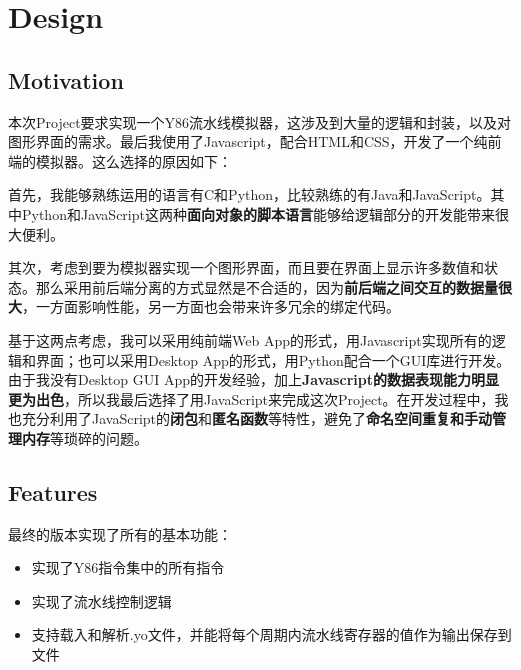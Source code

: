 
\section{Design}

\subsection{Motivation}

本次Project要求实现一个Y86流水线模拟器，这涉及到大量的逻辑和封装，以及对图形界面的需求。最后我使用了Javascript，配合HTML和CSS，开发了一个纯前端的模拟器。这么选择的原因如下：

首先，我能够熟练运用的语言有C和Python，比较熟练的有Java和JavaScript。其中Python和JavaScript这两种{\bf 面向对象的脚本语言}能够给逻辑部分的开发能带来很大便利。

其次，考虑到要为模拟器实现一个图形界面，而且要在界面上显示许多数值和状态。那么采用前后端分离的方式显然是不合适的，因为{\bf 前后端之间交互的数据量很大}，一方面影响性能，另一方面也会带来许多冗余的绑定代码。

基于这两点考虑，我可以采用纯前端Web App的形式，用Javascript实现所有的逻辑和界面；也可以采用Desktop App的形式，用Python配合一个GUI库进行开发。由于我没有Desktop GUI App的开发经验，加上{\bf Javascript的数据表现能力明显更为出色}，所以我最后选择了用JavaScript来完成这次Project。在开发过程中，我也充分利用了JavaScript的{\bf 闭包}和{\bf 匿名函数}等特性，避免了{\bf 命名空间重复和手动管理内存}等琐碎的问题。

\subsection{Features}

最终的版本实现了所有的基本功能：
\begin{itemize}
\item 实现了Y86指令集中的所有指令
\item 实现了流水线控制逻辑
\item 支持载入和解析.yo文件，并能将每个周期内流水线寄存器的值作为输出保存到文件
\end{itemize}

